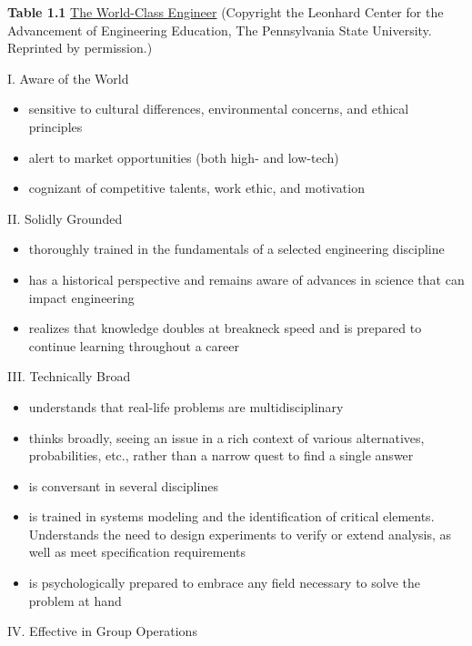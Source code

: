 \textbf{Table 1.1} \underline{The World-Class Engineer} (Copyright the Leonhard
Center for the Advancement of Engineering Education, The Pennsylvania
State University. Reprinted by permission.)

I. Aware of the World

\begin{itemize}
\item
  sensitive to cultural differences, environmental concerns, and ethical
  principles
\item
  alert to market opportunities (both high- and low-tech)
\item
  cognizant of competitive talents, work ethic, and motivation
\end{itemize}

II. Solidly Grounded

\begin{itemize}
\item
  thoroughly trained in the fundamentals of a selected engineering
  discipline
\item
  has a historical perspective and remains aware of advances in science
  that can impact engineering
\item
  realizes that knowledge doubles at breakneck speed and is prepared to
  continue learning throughout a career
\end{itemize}

III. Technically Broad

\begin{itemize}
\item
  understands that real-life problems are multidisciplinary
\item
  thinks broadly, seeing an issue in a rich context of various
  alternatives, probabilities, etc., rather than a narrow quest to find
  a single answer
\item
  is conversant in several disciplines
\item
  is trained in systems modeling and the identification of critical
  elements. Understands the need to design experiments to verify or
  extend analysis, as well as meet specification requirements
\item
  is psychologically prepared to embrace any field necessary to solve
  the problem at hand
\end{itemize}

IV. Effective in Group Operations

